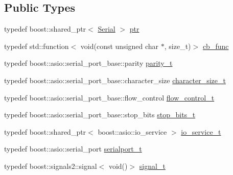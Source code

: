 \subsection*{Public Types}
\begin{DoxyCompactItemize}
\item 
typedef boost\+::shared\+\_\+ptr$<$ \hyperlink{classo_cpt_1_1protocol_1_1_serial}{Serial} $>$ \hyperlink{classo_cpt_1_1protocol_1_1_serial_a4c97c6a2456d649974e07a186f634780}{ptr}
\item 
typedef std\+::function$<$ void(const unsigned char $\ast$, size\+\_\+t)$>$ \hyperlink{classo_cpt_1_1protocol_1_1_serial_ad55591180be8bea2fe3832b1265b7496}{cb\+\_\+func}
\item 
typedef boost\+::asio\+::serial\+\_\+port\+\_\+base\+::parity \hyperlink{classo_cpt_1_1protocol_1_1_serial_aae21a39fe2f321475ca19d46bf40d5f3}{parity\+\_\+t}
\item 
typedef boost\+::asio\+::serial\+\_\+port\+\_\+base\+::character\+\_\+size \hyperlink{classo_cpt_1_1protocol_1_1_serial_a8799e83d5d812132c296dd4a6a17d6f6}{character\+\_\+size\+\_\+t}
\item 
typedef boost\+::asio\+::serial\+\_\+port\+\_\+base\+::flow\+\_\+control \hyperlink{classo_cpt_1_1protocol_1_1_serial_ad32f1d64fb16a5443d7aae92e8b14232}{flow\+\_\+control\+\_\+t}
\item 
typedef boost\+::asio\+::serial\+\_\+port\+\_\+base\+::stop\+\_\+bits \hyperlink{classo_cpt_1_1protocol_1_1_serial_aadc4c803ade35920211e6c6a202a8c1f}{stop\+\_\+bits\+\_\+t}
\item 
typedef boost\+::shared\+\_\+ptr$<$ boost\+::asio\+::io\+\_\+service $>$ \hyperlink{classo_cpt_1_1protocol_1_1_serial_ac9305799ef4be4eb50f1274184492f04}{io\+\_\+service\+\_\+t}
\item 
typedef boost\+::asio\+::serial\+\_\+port \hyperlink{classo_cpt_1_1protocol_1_1_serial_a3949fae08041279672bcb29b94d4cd52}{serialport\+\_\+t}
\item 
typedef boost\+::signals2\+::signal$<$ void()$>$ \hyperlink{classo_cpt_1_1protocol_1_1_serial_ad6b50eec67a064c4a2eb34d3ac605ffb}{signal\+\_\+t}
\end{DoxyCompactItemize}
